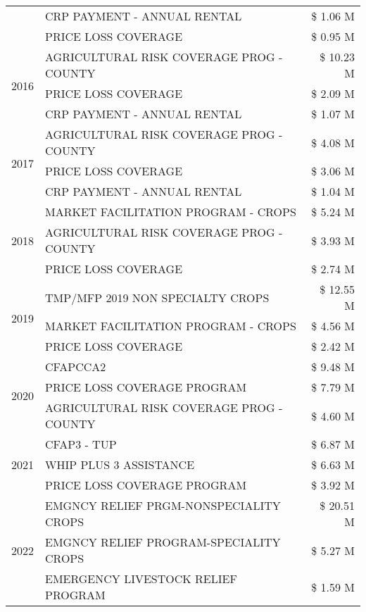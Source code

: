 \begin{tabular}{llr}
 & CRP PAYMENT - ANNUAL RENTAL & \$ 1.06 M \\
 & PRICE LOSS COVERAGE & \$ 0.95 M \\
\cline{1-3}
\multirow[t]{3}{*}{2016} & AGRICULTURAL RISK COVERAGE PROG - COUNTY & \$ 10.23 M \\
 & PRICE LOSS COVERAGE & \$ 2.09 M \\
 & CRP PAYMENT - ANNUAL RENTAL & \$ 1.07 M \\
\cline{1-3}
\multirow[t]{3}{*}{2017} & AGRICULTURAL RISK COVERAGE PROG - COUNTY & \$ 4.08 M \\
 & PRICE LOSS COVERAGE & \$ 3.06 M \\
 & CRP PAYMENT - ANNUAL RENTAL & \$ 1.04 M \\
\cline{1-3}
\multirow[t]{3}{*}{2018} & MARKET FACILITATION PROGRAM - CROPS & \$ 5.24 M \\
 & AGRICULTURAL RISK COVERAGE PROG - COUNTY & \$ 3.93 M \\
 & PRICE LOSS COVERAGE & \$ 2.74 M \\
\cline{1-3}
\multirow[t]{3}{*}{2019} & TMP/MFP 2019 NON SPECIALTY CROPS & \$ 12.55 M \\
 & MARKET FACILITATION PROGRAM - CROPS & \$ 4.56 M \\
 & PRICE LOSS COVERAGE & \$ 2.42 M \\
\cline{1-3}
\multirow[t]{3}{*}{2020} & CFAPCCA2 & \$ 9.48 M \\
 & PRICE LOSS COVERAGE PROGRAM & \$ 7.79 M \\
 & AGRICULTURAL RISK COVERAGE PROG - COUNTY & \$ 4.60 M \\
\cline{1-3}
\multirow[t]{3}{*}{2021} & CFAP3 - TUP & \$ 6.87 M \\
 & WHIP PLUS 3 ASSISTANCE & \$ 6.63 M \\
 & PRICE LOSS COVERAGE PROGRAM & \$ 3.92 M \\
\cline{1-3}
\multirow[t]{3}{*}{2022} & EMGNCY RELIEF PRGM-NONSPECIALITY CROPS & \$ 20.51 M \\
 & EMGNCY RELIEF PROGRAM-SPECIALITY CROPS & \$ 5.27 M \\
 & EMERGENCY LIVESTOCK RELIEF PROGRAM & \$ 1.59 M \\
\cline{1-3}
\bottomrule
\end{tabular}

